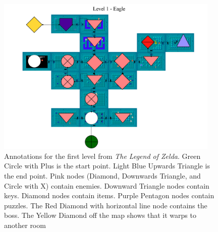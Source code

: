 \documentclass[a4paper]{article}
\begin{document}
 \begin{figure}[htb!]
  \centering
    \includegraphics[width=0.95\textwidth]{figures/CopyOfLoz1.png}
  \caption{Annotations for the first level from \textit{The Legend of Zelda}. Green Circle with Plus is the start point. Light Blue Upwards Triangle is the end point. Pink nodes (Diamond, Downwards Triangle, and Circle with X) contain enemies. Downward Triangle nodes contain keys. Diamond nodes contain items. Purple Pentagon nodes contain puzzles. The Red Diamond with horizontal line node contains the boss. The Yellow Diamond off the map shows that it warps to another room}
  \label{fig:Copy_of_LoZ_1}
\end{figure}
\end{document}
